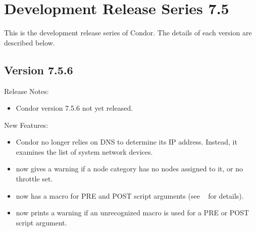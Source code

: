 
\section{\label{sec:History-7-5}Development Release Series 7.5}

This is the development release series of Condor.
The details of each version are described below.

\subsection*{\label{sec:New-7-5-6}Version 7.5.6}

\noindent Release Notes:

\begin{itemize}

\item Condor version 7.5.6 not yet released.

\end{itemize}


\noindent New Features:

\begin{itemize}

\item Condor no longer relies on DNS to determine its IP address.
  Instead, it examines the list of system network devices.

\item {} now gives a warning if a node category has no
nodes assigned to it, or no throttle set.

\item {} now has a  macro for PRE and
POST script arguments (see ~\pageref{dagman:SCRIPT} for details).

\item {} now prints a warning if an unrecognized macro is
used for a PRE or POST script argument.

\end{itemize}

